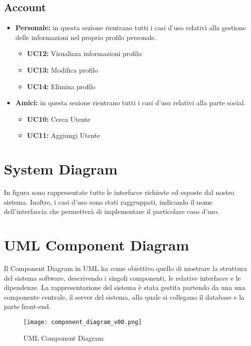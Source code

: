 \subsection{\textbf{Account}}
\begin{itemize}
    \item \textbf{Personale:} in questa sezione rientrano tutti i casi d'uso relativi alla gestione delle informazioni nel proprio profilo personale.
    \begin{itemize}
        \item \textbf{UC12:} Visualizza informazioni profilo 
        \item \textbf{UC13:} Modifica profilo 
        \item \textbf{UC14:} Elimina profilo 
    \end{itemize}
    
    \item \textbf{Amici:} in questa sezione rientrano tutti i casi d'uso relativi alla parte social.
    \begin{itemize}
        \item \textbf{UC10:} Cerca Utente 
        \item \textbf{UC11:} Aggiungi Utente 
    \end{itemize}
\end{itemize}


\newpage
\section{System Diagram}
In figura sono rappresentate tutte le interfacce richieste ed esposte dal nostro sistema. Inoltre,
i casi d'uso sono stati raggruppati, indicando il nome dell'interfaccia che permetterà di implementare
il particolare caso d'uso.


\newpage
\section{UML Component Diagram}
Il Component Diagram in UML ha come obiettivo quello di mostrare la struttura
del sistema software, descrivendo i singoli componenti, le relative interfacce 
e le dipendenze. 
La rappresentazione del sistema è stata gestita partendo da una
una componente centrale, il server del sistema, alla quale si collegano il database e la parte front-end.


\begin{figure}[H]
    \centering
    \texttt{[image: component\_diagram\_v00.png]}
    \caption{UML Component Diagram}
    \label{fig-uml-component-diag}
\end{figure}



